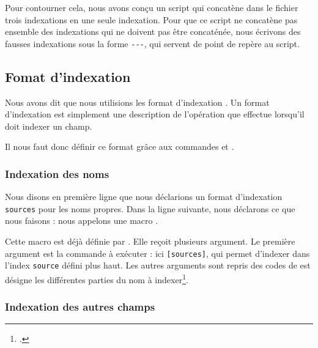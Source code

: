 \begin{bashcode}
\begin{description}
Pour contourner cela, nous avons conçu un script qui concatène dans le fichier  trois indexations en une seule indexation. Pour que ce script ne concatène pas ensemble des indexations qui ne doivent pas être concaténée, nous écrivons des fausses indexations sous la forme \verb|---|, qui servent de point de repère au script.
\end{description}

\subsection{Fomat d'indexation }

Nous avons dit que nous utilisions les format d'indexation . Un format d'indexation   est simplement une description de l'opération que  effectue lorsqu'il doit indexer un champ. 

Il nous faut donc définir ce format grâce aux commandes  et .

\subsubsection{Indexation des noms}

\begin{english}
\begin{latexcode}
\end{latexcode}
\end{english}

Nous disons en première ligne que nous déclarions un format d'indexation \verb|sources| pour les noms propres. Dans la ligne suivante, nous déclarons ce que nous faisons : nous appelons une macro . 

Cette macro est déjà définie par . Elle reçoit plusieurs argument. Le première argument est la commande à exécuter : ici \verb|[sources]|, qui permet d'indexer dans l'index \verb|source| défini plus haut. Les autres arguments sont repris des codes de  est désigne les différentes parties du nom à indexer\footcite[Nous renvoyons le lecteur à la documentation de  : ][]{biblatex_formats}.


\subsubsection{Indexation des autres champs}


\end{bashcode}
